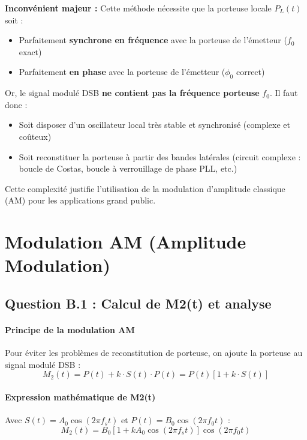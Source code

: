 \documentclass[11pt,a4paper]{article}
\begin{document}
\textbf{Inconvénient majeur :} Cette méthode nécessite que la porteuse locale $P_L(t)$ soit :
\begin{itemize}
    \item Parfaitement \textbf{synchrone en fréquence} avec la porteuse de l'émetteur ($f_0$ exact)
    \item Parfaitement \textbf{en phase} avec la porteuse de l'émetteur ($\phi_0$ correct)
\end{itemize}

Or, le signal modulé DSB \textbf{ne contient pas la fréquence porteuse} $f_0$. Il faut donc :
\begin{itemize}
    \item Soit disposer d'un oscillateur local très stable et synchronisé (complexe et coûteux)
    \item Soit reconstituer la porteuse à partir des bandes latérales (circuit complexe : boucle de Costas, boucle à verrouillage de phase PLL, etc.)
\end{itemize}

Cette complexité justifie l'utilisation de la modulation d'amplitude classique (AM) pour les applications grand public.

\section{Modulation AM (Amplitude Modulation)}

\subsection{Question B.1 : Calcul de M2(t) et analyse}

\paragraph{Principe de la modulation AM}

Pour éviter les problèmes de reconstitution de porteuse, on ajoute la porteuse au signal modulé DSB :
\begin{equation}
M_2(t) = P(t) + k \cdot S(t) \cdot P(t) = P(t)[1 + k \cdot S(t)]
\end{equation}

\paragraph{Expression mathématique de M2(t)}

Avec $S(t) = A_0 \cos(2\pi f_s t)$ et $P(t) = B_0 \cos(2\pi f_0 t)$ :
\begin{equation}
\boxed{M_2(t) = B_0[1 + k A_0 \cos(2\pi f_s t)] \cos(2\pi f_0 t)}
\end{equation}
\end{document}

